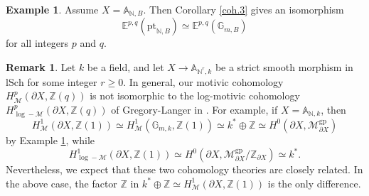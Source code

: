 \documentclass[10pt]{amsart}
\theoremstyle{definition}
\newtheorem{rmk}[thm]{Remark}
\newtheorem{exm}[thm]{Example}
\theoremstyle{remark}
\numberwithin{equation}{subsection}
\newcommand{\A}{\mathbb{A}}
\newcommand{\E}{\mathbb{E}}
\newcommand{\G}{\mathbb{G}}
\newcommand{\N}{\mathbb{N}}
\newcommand{\Z}{\mathbb{Z}}
\newcommand{\cM}{\mathcal{M}}
\newcommand{\pt}{\mathrm{pt}}
\newcommand{\lSch}{\mathrm{lSch}}
\newcommand{\gp}{\mathrm{gp}}
\begin{document}
\begin{exm}
\label{coh.4}
Assume $X=\A_{\N,B}$.
Then Corollary \ref{coh.3} gives an isomorphism
\[
\E^{p,q}(\pt_{\N,B})
\simeq
\E^{p,q}(\G_{m,B})
\]
for all integers $p$ and $q$.
\end{exm}

\begin{rmk}
Let $k$ be a field,
and let $X\to \A_{\N^r,k}$ be a strict smooth morphism in $\lSch$ for some integer $r\geq 0$.
In general, our motivic cohomology $H_{\cM}^p(\partial X,\Z(q))$ is not isomorphic to the log-motivic cohomology $H_{\log-\cM}^p(\partial X,\Z(q))$ of Gregory-Langer in \cite{2108.02845}.
For example, if $X=\A_{\N,k}$, then
\[
H_{\cM}^1(\partial X,\Z(1))\simeq H_{\cM}^1(\G_{m,k},\Z(1))\simeq k^*\oplus \Z
\simeq
H^0(\partial X,\cM_{\partial X}^\gp)
\]
by Example \ref{coh.4}, while 
\[
H_{\log-\cM}^1(\partial X,\Z(1))
\simeq
H^0(\partial X,\cM_{\partial X}^\gp/\Z_{\partial X})
\simeq
k^*.
\]
Nevertheless, we expect that these two cohomology theories are closely related.
In the above case, the factor $\Z$ in $k^*\oplus \Z\simeq H_\cM^1(\partial X,\Z(1))$ is the only difference.
\end{rmk}








\end{document}
